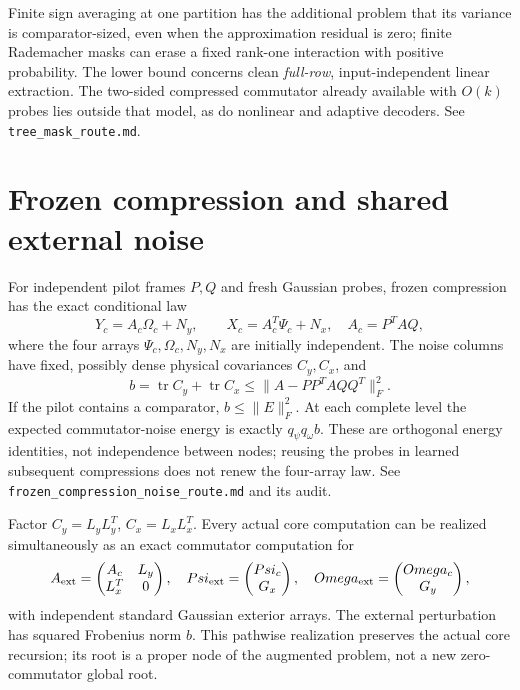 \documentclass[11pt,oneside,openany,a4paper]{report}
\numberwithin{equation}{chapter}
\theoremstyle{definition}
\theoremstyle{remark}
\newcommand{\sourcefile}[1]{{\small\nolinkurl{#1}}}
\begin{document}
Finite sign averaging at one partition has the additional problem
that its variance is comparator-sized, even when the approximation
residual is zero; finite Rademacher masks can erase a fixed rank-one
interaction with positive probability.  The lower bound concerns clean
\emph{full-row}, input-independent linear extraction.  The two-sided
compressed commutator already available with $O(k)$ probes lies outside
that model, as do nonlinear and adaptive decoders.
See \sourcefile{tree_mask_route.md}.

\section{Frozen compression and shared external noise}
\label{sec:later-frozen}

For independent pilot frames $P,Q$ and fresh Gaussian probes, frozen
compression has the exact conditional law
\[
 Y_c=A_c\Omega_c+N_y,\qquad X_c=A_c^T\Psi_c+N_x,
 \quad A_c=P^TAQ,
\]
where the four arrays $\Psi_c,\Omega_c,N_y,N_x$ are initially
independent.  The noise columns have fixed, possibly dense physical
covariances $C_y,C_x$, and
\[
 b=\operatorname{tr}C_y+\operatorname{tr}C_x
 \le\|A-PP^TAQQ^T\|_F^2.
\]
If the pilot contains a comparator, $b\le\|E\|_F^2$.  At each complete
level the expected commutator-noise energy is exactly
$q_\psi q_\omega b$.  These are orthogonal energy identities, not
independence between nodes; reusing the probes in learned subsequent
compressions does not renew the four-array law.
See \sourcefile{frozen_compression_noise_route.md} and its audit.

Factor $C_y=L_yL_y^T$, $C_x=L_xL_x^T$.  Every actual core computation
can be realized simultaneously as an exact commutator computation for
\[
 A_{\rm ext}=\begin{pmatrix}A_c&L_y\\L_x^T&0\end{pmatrix},
 \quad\Psi_{\rm ext}=\begin{pmatrix}\Psi_c\\G_x\end{pmatrix},
 \quad\Omega_{\rm ext}=\begin{pmatrix}\Omega_c\\G_y\end{pmatrix},
\]
with independent standard Gaussian exterior arrays.  The external
perturbation has squared Frobenius norm $b$.  This pathwise realization
preserves the actual core recursion; its root is a proper node of the
augmented problem, not a new zero-commutator global root.
\end{document}
